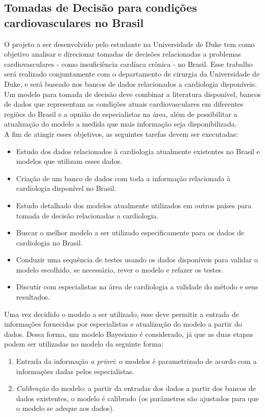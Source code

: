 \documentclass{article}
\begin{document}
\subsection{ \label{subsec:cardiovascular} Tomadas de Decisão para condições cardiovasculares no Brasil}
O projeto a ser desenvolvido pelo estudante na Universidade de Duke tem como objetivo analisar e direcionar tomadas de decisões relacionadas a problemas cardiovasculares - como insuficiência cardíaca crônica -  no Brasil. Esse trabalho será realizado conjuntamente com o departamento de cirurgia da Universidade de Duke, e será baseado nos bancos de dados relacionados a cardiologia disponíveis.\\
Um modelo para tomada de decisão deve combinar a literatura disponível, bancos de dados que representam as condições atuais cardiovasculares em diferentes regiões do Brasil e a opnião de especialistas na área, além de possibilitar a atualização do modelo a medida que mais informação seja disponibilizada.\\
A fim de atingir esses objetivos, as seguintes tarefas devem ser executadas:
\begin{itemize}
	\item Estudo dos dados relacionados à cardiologia atualmente existentes no Brasil e modelos que utilizam esses dados.
	\item Criação de um banco de dados com toda a informação relacionada à cardiologia disponível no Brasil.
	\item Estudo detalhado dos modelos atualmente utilizados em outros países para tomada de decisão relacionadas a cardiologia.
	\item Buscar o melhor modelo a ser utilizado especificamente para os dados de cardiologia no Brasil.
	\item Conduzir uma sequência de testes usando os dados disponíveis para validar o modelo escolhido, se necessário, rever o modelo e refazer os testes.
	\item Discutir com especialistas na área de cardiologia a validade do método e seus resultados.
\end{itemize}
Uma vez decidido o modelo a ser utilizado, esse deve permitir a entrada de informações fornecidas por especialistas e 
atualização do modelo a partir do dados. Dessa forma, um modelo Bayesiano é considerado, já que as duas etapas podem 
ser utilizadas no modelo da seguinte forma:
 \begin{enumerate} 
	\item Entrada da informação \textit{a priori}: o modelos é parametrizado de acordo com a informações dadas 
		pelos especialistas.
	\item \textit{Calibração} do modelo: a partir da entradas dos dados a partir dos bancos de dados existentes, 
o modelo é calibrado (os parâmetros são ajustados para que o modelo se adeque aos dados).
 \end{enumerate}
\end{document}
